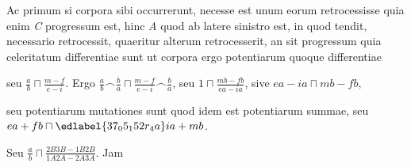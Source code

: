 %
Ac primum si corpora sibi occurrerunt, necesse est unum eorum retrocessisse quia enim \textit{C} progressum est, hinc \textit{A} quod ab latere sinistro est, in quod tendit, necessario retrocessit, quaeritur
%
%
alterum 
%
%
retrocesserit, an sit progressum quia celeritatum differentiae\protect{} sunt ut corpora %
%
ergo potentiarum quoque differentiae\protect{} %
\rule[0cm]{0mm}{16pt} %
%
seu
%
%
$\displaystyle\frac{a}{b}\sqcap \displaystyle\frac{m-f}{e-i}$. Ergo%
%
%
$\displaystyle\frac{a}{b}\smallfrown \displaystyle\frac{b}{a}\sqcap \displaystyle\frac{m-f}{e-i}\smallfrown \displaystyle\frac{b}{a}$, seu $1 \sqcap \displaystyle\frac{mb-fb}{ea-ia}$, sive $ea-ia\sqcap mb-fb$, 
%
\rule[0cm]{0mm}{10pt}seu potentiarum mutationes\protect{} sunt %
%
 quod idem est potentiarum summae,\protect{} 
%
seu $ea+fb\sqcap%
\edlabel{37_05_152r_4a}%
ia+mb$. 
\rule[0cm]{0mm}{18pt}Seu $\displaystyle\frac{a}{b}\sqcap \displaystyle\frac{{\scriptstyle \textit{2}}B{\scriptstyle \textit{3}}B-{\scriptstyle \textit{1}}B{\scriptstyle \textit{2}}B}{{\scriptstyle \textit{1}}A{\scriptstyle \textit{2}}A-{\scriptstyle \textit{2}}A{\scriptstyle \textit{3}}A}$. Jam%
%
